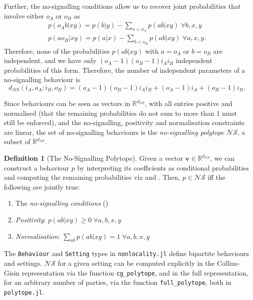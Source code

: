 \documentclass[10pt, a4paper]{article}
\numberwithin{equation}{section} %
\newcounter{stmt} %
\theoremstyle{definition}
\newtheorem{defn}[stmt]{Definition}
\theoremstyle{plain}
\newcommand{\?}{\mathrel{?}} %
\newcommand{\R}{\mathbb{R}} %
\newcommand{\cvec}[1]{\boldsymbol{\mathbf{#1}}}    %
\newcommand{\NSs}{\mathcal{NS}}
\begin{document}
    Further, the no-signalling conditions allow us to recover joint probabilities that involve either \(o_A\) or \(o_B\) as
    \begin{gather}
      p(o_A b|xy) = p(b|y) - \sum_{a < o_A} p(ab|xy)\;\forall b,x,y\label{eqn:cgtofullA} \\
      p(ao_B|xy) = p(a|x) - \sum_{b < o_B} p(ab|xy)\;\forall a,x,y.\label{eqn:cgtofullB}
    \end{gather}
    Therefore, none of the probabilities \(p(ab|xy)\) with \(a = o_A\) or \(b = o_B\) are independent, and we have only \((o_A-1)(o_B-1){i_A}{i_B}\) independent probabilities of this form. Therefore, the number of independent parameters of a no-signalling behaviour is
    \begin{equation} d_{NS}(i_A, o_A; i_B, o_B) = (o_A-1)(o_B-1){i_A}{i_B} + (o_A-1)i_A + (o_B-1)i_B. \end{equation}

    Since behaviours can be seen as vectors in \(\R^{d_{NS}}\), with all entries positive and normalised (that the remaining probabilities do not sum to more than 1 must still be enforced), and the no-signalling, positivity and normalisation constraints are linear, the set of no-signalling behaviours is the \emph{no-signalling polytope} \(\NSs\), a subset of \(\R^{d_{NS}}\).
    \begin{defn}[The No-Signalling Polytope]
      Given a vector \(\cvec{v} \in \R^{d_{NS}}\), we can construct a behaviour \(p\) by interpreting its coefficients as conditional probabilities and computing the remaining probabilities via  and . Then, \(p \in \NSs\) iff the following are jointly true:
      \begin{enumerate}
        \item The \emph{no-signalling conditions} ()
        \item \emph{Positivity}: \(p(ab|xy) \geq 0\;\forall a,b,x,y\) 
        \item \emph{Normalisation}: \(\sum_{ab} p(ab|xy) = 1\;\forall a,b,x,y\)
      \end{enumerate}
    \end{defn}

    The \verb`Behaviour` and \verb`Setting` types in \verb`nonlocality.jl` define bipartite behaviours and settings. \(\NSs\) for a given setting can be computed explicitly in the Collins-Gisin representation via the function \verb`cg_polytope`, and in the full representation, for an arbitrary number of parties, via the function \verb`full_polytope`, both in \verb`polytope.jl`.
\end{document}
